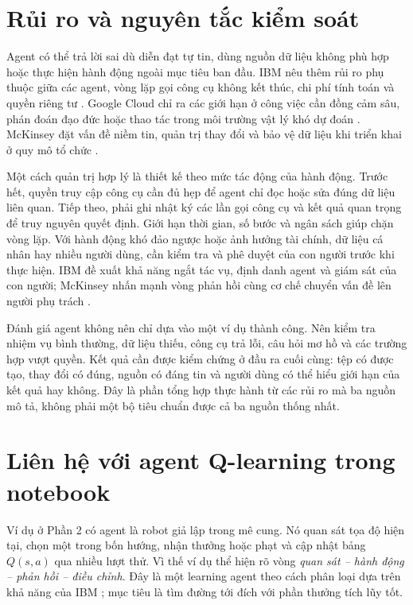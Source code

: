 \documentclass[12pt,a4paper]{report}
\begin{document}
\section{Rủi ro và nguyên tắc kiểm soát}
Agent có thể trả lời sai dù diễn đạt tự tin, dùng nguồn dữ liệu không phù hợp hoặc
thực hiện hành động ngoài mục tiêu ban đầu. IBM nêu thêm rủi ro phụ thuộc giữa các
agent, vòng lặp gọi công cụ không kết thúc, chi phí tính toán và quyền riêng tư
\cite{ibm}. Google Cloud chỉ ra các giới hạn ở công việc cần đồng cảm sâu, phán đoán
đạo đức hoặc thao tác trong môi trường vật lý khó dự đoán \cite{google}. McKinsey đặt
vấn đề niềm tin, quản trị thay đổi và bảo vệ dữ liệu khi triển khai ở quy mô tổ chức
\cite{mckinsey}.

Một cách quản trị hợp lý là thiết kế theo mức tác động của hành động. Trước hết,
quyền truy cập công cụ cần đủ hẹp để agent chỉ đọc hoặc sửa đúng dữ liệu liên quan.
Tiếp theo, phải ghi nhật ký các lần gọi công cụ và kết quả quan trọng để truy nguyên
quyết định. Giới hạn thời gian, số bước và ngân sách giúp chặn vòng lặp. Với hành
động khó đảo ngược hoặc ảnh hưởng tài chính, dữ liệu cá nhân hay nhiều người dùng,
cần kiểm tra và phê duyệt của con người trước khi thực hiện. IBM đề xuất khả năng
ngắt tác vụ, định danh agent và giám sát của con người; McKinsey nhấn mạnh vòng phản
hồi cùng cơ chế chuyển vấn đề lên người phụ trách \cite{ibm,mckinsey}.

Đánh giá agent không nên chỉ dựa vào một ví dụ thành công. Nên kiểm tra nhiệm vụ
bình thường, dữ liệu thiếu, công cụ trả lỗi, câu hỏi mơ hồ và các trường hợp vượt
quyền. Kết quả cần được kiểm chứng ở đầu ra cuối cùng: tệp có được tạo, thay đổi có
đúng, nguồn có đáng tin và người dùng có thể hiểu giới hạn của kết quả hay không.
Đây là phần tổng hợp thực hành từ các rủi ro mà ba nguồn mô tả, không phải một bộ
tiêu chuẩn được cả ba nguồn thống nhất.

\section{Liên hệ với agent Q-learning trong notebook}
Ví dụ ở Phần 2 có agent là robot giả lập trong mê cung. Nó quan sát tọa độ hiện tại,
chọn một trong bốn hướng, nhận thưởng hoặc phạt và cập nhật bảng $Q(s,a)$ qua nhiều
lượt thử. Vì thế ví dụ thể hiện rõ vòng \emph{quan sát -- hành động -- phản hồi --
điều chỉnh}. Đây là một learning agent theo cách phân loại dựa trên khả năng của IBM
\cite{ibm}; mục tiêu là tìm đường tới đích với phần thưởng tích lũy tốt.
\end{document}
